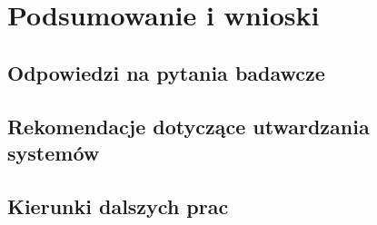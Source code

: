 \chapter{Podsumowanie i wnioski}\label{ch:podsumowanie}
\section{Odpowiedzi na pytania badawcze}
\section{Rekomendacje dotyczące utwardzania systemów}
\section{Kierunki dalszych prac}

